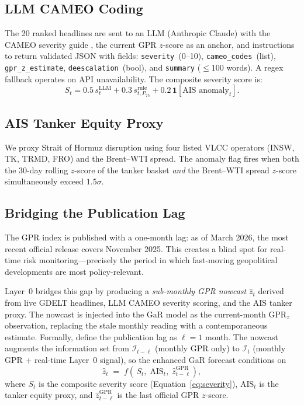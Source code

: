 \documentclass[12pt]{article}
\begin{document}
\subsection{LLM CAMEO Coding}

The 20 ranked headlines are sent to an LLM (Anthropic Claude) with the
CAMEO severity guide \citep{schrodt2009}, the current GPR $z$-score as
an anchor, and instructions to return validated JSON with fields:
\texttt{severity}~(0--10), \texttt{cameo\_codes}~(list),
\texttt{gpr\_z\_estimate}, \texttt{deescalation}~(bool),
and \texttt{summary} ($\leq 100$ words).
A regex fallback operates on API unavailability.
The composite severity score is:
\begin{equation}
S_t = 0.5\,s^{\text{LLM}}_t + 0.3\,s^{\text{rule}}_{t,P_{75}}
    + 0.2\,\mathbf{1}[\text{AIS anomaly}_t].
\label{eq:severity}
\end{equation}

\subsection{AIS Tanker Equity Proxy}

We proxy Strait of Hormuz disruption using four listed VLCC operators
(INSW, TK, TRMD, FRO) and the Brent--WTI spread.
The anomaly flag fires when both the 30-day rolling $z$-score of the
tanker basket \textit{and} the Brent--WTI spread $z$-score simultaneously
exceed $1.5\sigma$.

\subsection{Bridging the Publication Lag}
\label{sec:lag}

The GPR index is published with a one-month lag: as of March 2026, the
most recent official release covers November 2025.
This creates a blind spot for real-time risk monitoring---precisely the
period in which fast-moving geopolitical developments are most
policy-relevant.

Layer~0 bridges this gap by producing a \textit{sub-monthly GPR nowcast}
$\hat{z}_t$ derived from live GDELT headlines, LLM CAMEO severity scoring,
and the AIS tanker proxy.
The nowcast is injected into the GaR model as the current-month
$\text{GPR}_z$ observation, replacing the stale monthly reading with a
contemporaneous estimate.
Formally, define the publication lag as $\ell = 1$ month.
The nowcast augments the information set from
$\mathcal{I}_{t-\ell}$ (monthly GPR only) to
$\mathcal{I}_t$ (monthly GPR + real-time Layer~0 signal),
so the enhanced GaR forecast conditions on
\begin{equation}
\hat{z}_t \;=\; f\!\left(\,S_t,\;\text{AIS}_t,\;\hat{z}^{\text{GPR}}_{t-\ell}\right),
\label{eq:nowcast}
\end{equation}
where $S_t$ is the composite severity score (Equation~\ref{eq:severity}),
$\text{AIS}_t$ is the tanker equity proxy, and
$\hat{z}^{\text{GPR}}_{t-\ell}$ is the last official GPR $z$-score.
\end{document}
